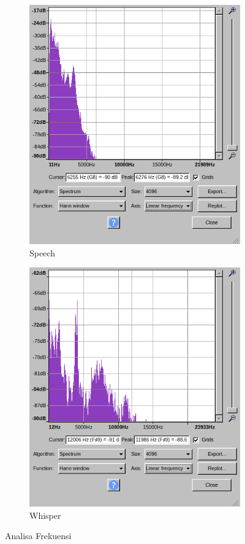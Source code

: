 \documentclass[12pt,]{article}
\begin{document}
	\begin{figure}[!ht]
		\centering
		\begin{subfigure}[b]{0.3\textwidth}
			\includegraphics[width=\textwidth]{images/elitech_testAudioSpeechFreq}
			\caption{Speech}
		\end{subfigure}
		\begin{subfigure}[b]{0.3\textwidth}
			\includegraphics[width=\textwidth]{images/elitech_testAudioWhisperFreq}
			\caption{Whisper}
		\end{subfigure}
		\caption{Analisa Frekuensi}
	\end{figure}
\end{document}
